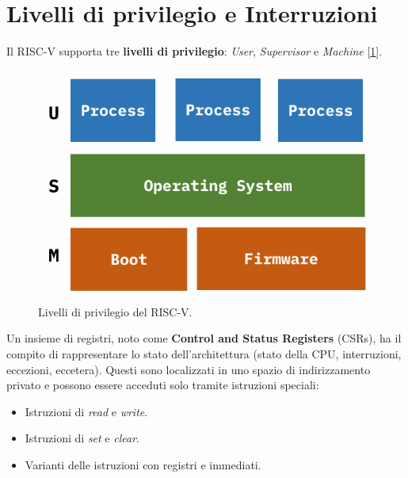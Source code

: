 \section{Livelli di privilegio e Interruzioni}
Il RISC-V supporta tre \textbf{livelli di privilegio}: \textit{User}, \textit{Supervisor} e \textit{Machine} [\ref{fig:risc-v-privilege}].
\begin{figure}[!h]
	\centering
	\includegraphics[width=0.3\linewidth]{img/risc-v-privilege}
	\caption{Livelli di privilegio del RISC-V.}
	\label{fig:risc-v-privilege}
\end{figure}
Un insieme di registri, noto come \textbf{Control and Status Registers} (CSRs), ha il compito di rappresentare lo stato dell'architettura (stato della CPU, interruzioni, eccezioni, eccetera). Questi sono localizzati in uno spazio di indirizzamento privato e possono essere acceduti solo tramite istruzioni speciali:
\begin{itemize}
	\item Istruzioni di \textit{read} e \textit{write}.
	\item Istruzioni di \textit{set} e \textit{clear}.
	\item Varianti delle istruzioni con registri e immediati.
\end{itemize}

